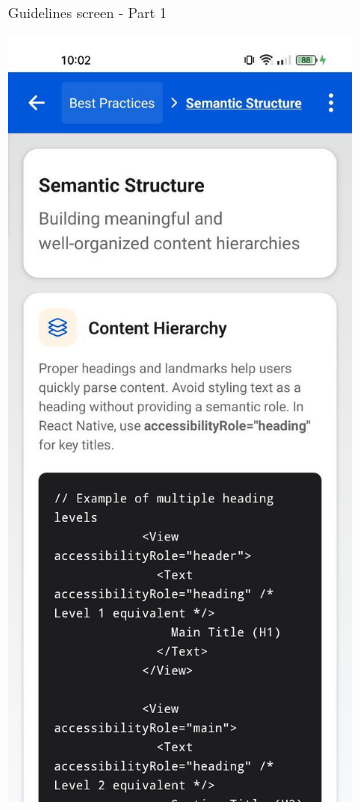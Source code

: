 \begin{enumerate}
\begin{itemize}
\begin{figure}[ht]
\begin{subfigure}[b]{0.48\textwidth}
                \caption{Guidelines screen - Part 1}
                \label{fig:guidelines-left}
            \end{subfigure}
            \hfill
            \begin{subfigure}[b]{0.48\textwidth}
                \centering
                \includegraphics[width=\linewidth, alt={Second part of the WCAG guidelines screen}]{img/guidelines2.jpg}

\end{subfigure}
\end{figure}
\end{itemize}
\end{enumerate}
